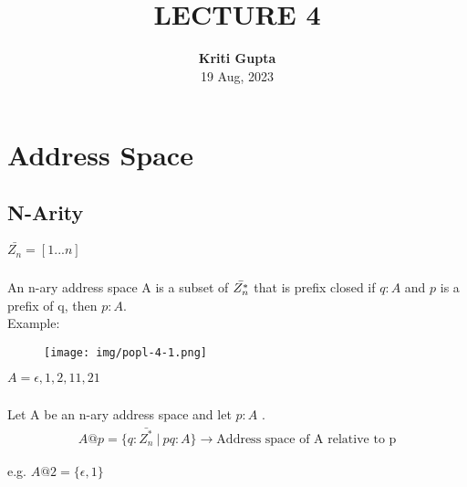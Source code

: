 \documentclass{article}
\begin{document}

\title{ \normalsize \textsc{}
		\\ [2.0cm]
		\LARGE \textbf{\uppercase{Lecture 4}
		 \\ [0.6cm] \LARGE{ } \vspace*{10\baselineskip}}
		}
\date{}
\author{\textbf{Kriti Gupta} \\ 
		19 Aug, 2023}

\maketitle

\tableofcontents
\newpage


\section{Address Space}
\subsection{N-Arity}
$\bar{Z_{n}} = [1...n]$

\subsubsection{}An n-ary address space A is a subset of $\Bar{Z^{*}_{n}}$ that is prefix closed if $q: A$ and $p$ is a prefix of q, then $p: A$.\\

Example:
\begin{figure}[htbp]
    \center
    \texttt{[image: img/popl-4-1.png]}
    \caption{}
\end{figure}

$A = {\epsilon, 1, 2, 11, 21}$
\subsubsection{}
Let A be an n-ary address space and let $p:A$ .
\begin{gather}
    A@p = \{q: \bar{Z_{n}^{*}}\  \vert\  pq: A\}  \xrightarrow{} \text{Address space of A relative to p}
\end{gather}

e.g.
\indent $A@2 = \{\epsilon, 1\}$
\end{document}
